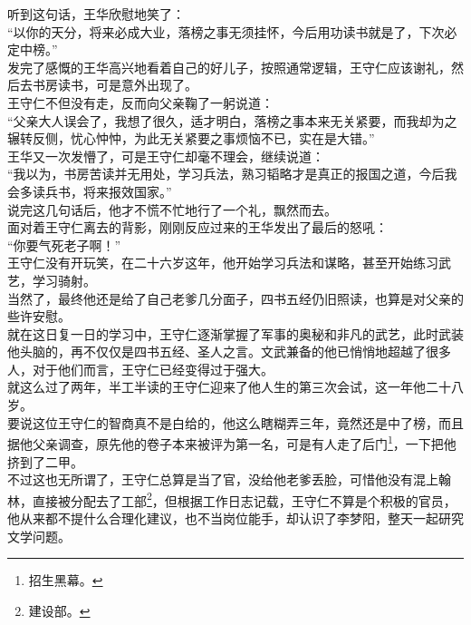 \begin{multicols}{\theparacolNo}
听到这句话，王华欣慰地笑了：\\

“以你的天分，将来必成大业，落榜之事无须挂怀，今后用功读书就是了，下次必定中榜。”\\

发完了感慨的王华高兴地看着自己的好儿子，按照通常逻辑，王守仁应该谢礼，然后去书房读书，可是意外出现了。\\

王守仁不但没有走，反而向父亲鞠了一躬说道：\\

“父亲大人误会了，我想了很久，适才明白，落榜之事本来无关紧要，而我却为之辗转反侧，忧心忡忡，为此无关紧要之事烦恼不已，实在是大错。”\\

王华又一次发懵了，可是王守仁却毫不理会，继续说道：\\

“我以为，书房苦读并无用处，学习兵法，熟习韬略才是真正的报国之道，今后我会多读兵书，将来报效国家。”\\

说完这几句话后，他才不慌不忙地行了一个礼，飘然而去。\\

面对着王守仁离去的背影，刚刚反应过来的王华发出了最后的怒吼：\\

“你要气死老子啊！”\\

王守仁没有开玩笑，在二十六岁这年，他开始学习兵法和谋略，甚至开始练习武艺，学习骑射。\\

当然了，最终他还是给了自己老爹几分面子，四书五经仍旧照读，也算是对父亲的些许安慰。\\

就在这日复一日的学习中，王守仁逐渐掌握了军事的奥秘和非凡的武艺，此时武装他头脑的，再不仅仅是四书五经、圣人之言。文武兼备的他已悄悄地超越了很多人，对于他们而言，王守仁已经变得过于强大。\\

就这么过了两年，半工半读的王守仁迎来了他人生的第三次会试，这一年他二十八岁。\\

要说这位王守仁的智商真不是白给的，他这么瞎糊弄三年，竟然还是中了榜，而且据他父亲调查，原先他的卷子本来被评为第一名，可是有人走了后门\footnote{招生黑幕。}，一下把他挤到了二甲。\\

不过这也无所谓了，王守仁总算是当了官，没给他老爹丢脸，可惜他没有混上翰林，直接被分配去了工部\footnote{建设部。}，但根据工作日志记载，王守仁不算是个积极的官员，他从来都不提什么合理化建议，也不当岗位能手，却认识了李梦阳，整天一起研究文学问题。\\


\end{multicols}

